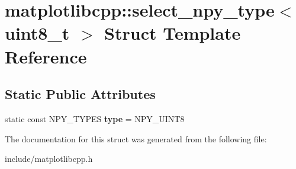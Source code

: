 \hypertarget{structmatplotlibcpp_1_1select__npy__type_3_01uint8__t_01_4}{}\section{matplotlibcpp\+:\+:select\+\_\+npy\+\_\+type$<$ uint8\+\_\+t $>$ Struct Template Reference}
\label{structmatplotlibcpp_1_1select__npy__type_3_01uint8__t_01_4}
\subsection*{Static Public Attributes}
\begin{DoxyCompactItemize}
\item 
static const N\+P\+Y\+\_\+\+T\+Y\+P\+ES {\bfseries type} = N\+P\+Y\+\_\+\+U\+I\+N\+T8\hypertarget{structmatplotlibcpp_1_1select__npy__type_3_01uint8__t_01_4_a6e80bfd252a69f14ff869c8b4fbb9e54}{}\label{structmatplotlibcpp_1_1select__npy__type_3_01uint8__t_01_4_a6e80bfd252a69f14ff869c8b4fbb9e54}

\end{DoxyCompactItemize}


The documentation for this struct was generated from the following file\+:\begin{DoxyCompactItemize}
\item 
include/matplotlibcpp.\+h\end{DoxyCompactItemize}
